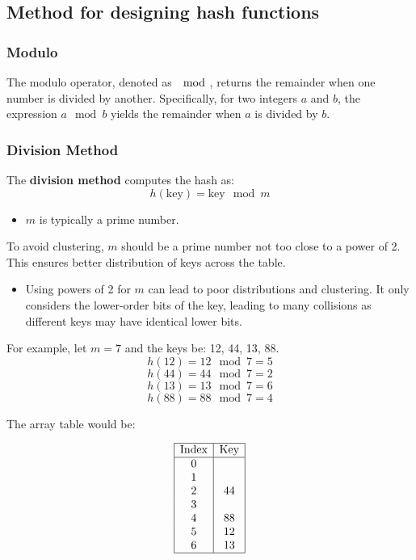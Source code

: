 \subsection{Method for designing hash functions}
\subsubsection{Modulo}
\begin{definition}
    The modulo operator, denoted as \( \mod \), returns the remainder when one number is divided by another. Specifically, for two integers \( a \) and \( b \), the expression \( a \mod b \) yields the remainder when \( a \) is divided by \( b \).
\end{definition}

\subsubsection{Division Method}
\begin{definition}
    The \textbf{division method} computes the hash as:
    \[
    h(\text{key}) = \text{key} \mod m
    \]
    \begin{itemize}
        \item \( m \) is typically a prime number. 
    \end{itemize}
\end{definition}

\begin{intuition}
    To avoid clustering, \( m \) should be a prime number not too close to a power of 2. This ensures better distribution of keys across the table. 
    \begin{itemize}
        \item Using powers of 2 for \( m \) can lead to poor distributions and clustering. It only considers the lower-order bits of the key, leading to many collisions as different keys may have identical lower bits.

    \end{itemize}
\end{intuition}

\begin{example}
    For example, let \( m = 7 \) and the keys be: 12, 44, 13, 88.
    \[
    h(12) = 12 \mod 7 = 5
    \]
    \[
    h(44) = 44 \mod 7 = 2
    \]
    \[
    h(13) = 13 \mod 7 = 6
    \]
    \[
    h(88) = 88 \mod 7 = 4
    \]

    The array table would be:

    \[
    \begin{array}{|c|c|}
    \hline
    \text{Index} & \text{Key} \\
    \hline
    0 &  \\
    1 &  \\
    2 & 44 \\
    3 &  \\
    4 & 88 \\
    5 & 12 \\
    6 & 13 \\
    \hline
    \end{array}
    \]
\end{example}

